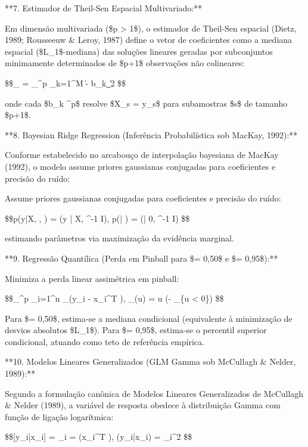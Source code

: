 \documentclass[12pt,a4paper]{article}
\begin{document}
**7. Estimador de Theil-Sen Espacial Multivariado:**

Em dimensão multivariada (\$p > 1\$), o estimador de Theil-Sen espacial (Dietz, 1989; Rousseeuw \& Leroy, 1987) define o vetor de coeficientes como a mediana espacial (\$L\_1\$-mediana) das soluções lineares geradas por subconjuntos minimamente determinados de \$p+1\$ observações não colineares:

\$\$\hat{\beta}\_{} = \arg\min\_{\beta \in {}^p} \sum\_{k=1}^M \|\beta - b\_k\|\_2 \$\$

onde cada \$b\_k \in {}^p\$ resolve \$X\_s \beta = y\_s\$ para subamostras \$s\$ de tamanho \$p+1\$.

**8. Bayesian Ridge Regression (Inferência Probabilística sob MacKay, 1992):**

Conforme estabelecido no arcabouço de interpolação bayesiana de MacKay (1992), o modelo assume priores gaussianas conjugadas para coeficientes e precisão do ruído:

Assume priores gaussianas conjugadas para coeficientes e precisão do ruído:

\$\$p(y|X, \beta, \alpha) = (y | X\beta, \alpha^{-1} I), \quad p(\beta | \lambda) = (\beta | 0, \lambda^{-1} I) \$\$

estimando parâmetros via maximização da evidência marginal.

**9. Regressão Quantílica (Perda em Pinball para \$\tau = 0,50\$ e \$\tau = 0,95\$):**

Minimiza a perda linear assimétrica em pinball:

\$\$\min\_{\beta \in {}^p} \sum\_{i=1}^n \rho\_\tau(y\_i - x\_i^T \beta), \quad \rho\_\tau(u) = u (\tau - \_{\{u < 0\}}) \$\$

Para \$\tau = 0,50\$, estima-se a mediana condicional (equivalente à minimização de desvios absolutos \$L\_1\$). Para \$\tau = 0,95\$, estima-se o percentil superior condicional, atuando como teto de referência empírica.

**10. Modelos Lineares Generalizados (GLM Gamma sob McCullagh \& Nelder, 1989):**

Segundo a formulação canônica de Modelos Lineares Generalizados de McCullagh \& Nelder (1989), a variável de resposta obedece à distribuição Gamma com função de ligação logarítmica:

\$\$[y\_i|x\_i] = \mu\_i = \exp(x\_i^T \beta), \quad {}(y\_i|x\_i) = \phi \mu\_i^2 \$\$
\end{document}
